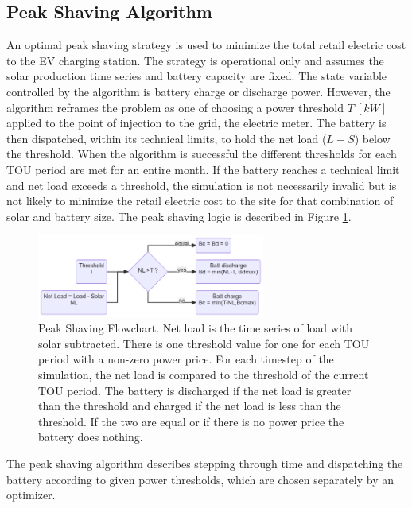 \documentclass[journal,article,submit,pdftex,moreauthors]{Definitions/mdpi}
\begin{document}
\subsection{Peak Shaving Algorithm}\label{peak-shaving-algorithm}%

An optimal peak shaving strategy is used to minimize the total retail electric cost to the EV charging station. The strategy is operational only and assumes the solar production time series and battery capacity are fixed. The state variable controlled by the algorithm is battery charge or discharge power. However, the algorithm reframes the problem as one of choosing a power threshold \(T\ [kW]\) applied to the point of injection to the grid, the electric meter. The battery is then dispatched, within its technical limits, to hold the net load ($L-S$) below the threshold. When the algorithm is successful the different thresholds for each TOU period are met for an entire month. If the battery reaches a technical limit and net load exceeds a threshold, the simulation is not necessarily invalid but is not likely to minimize the retail electric cost to the site for that combination of solar and battery size. The peak shaving logic is described in Figure \ref{fig:peakshaving-flowchart}.

\begin{figure}
  \centering
  \includegraphics[width=7.5cm]{./images/peak shaving flowchart.png}
  \caption{Peak Shaving Flowchart. Net load is the time series of load with solar subtracted. There is one threshold value for one for each TOU period with a non-zero power price. For each timestep of the simulation, the net load is compared to the threshold of the current TOU period. The battery is discharged if the net load is greater than the threshold and charged if the net load is less than the threshold. If the two are equal or if there is no power price the battery does nothing.}
  \label{fig:peakshaving-flowchart}
\end{figure}

The peak shaving algorithm describes stepping through time and dispatching the battery according to given power thresholds, which are chosen separately by an optimizer.
\end{document}
